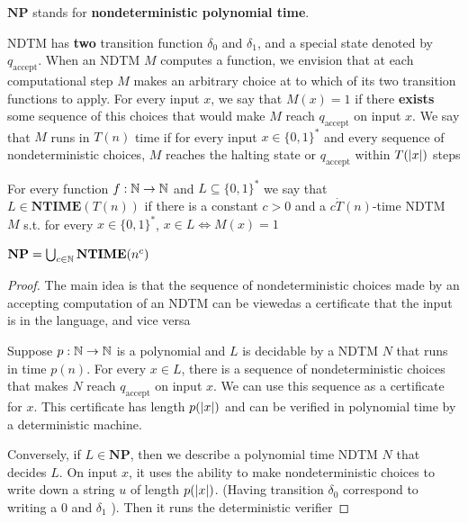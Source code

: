 \documentclass[11pt]{article}
\def \NTIME {\textbf{NTIME}}
\def \NP {\textbf{NP}}
\def \NP {\textbf{NP}}
\def \accept {\text{accept}}
\begin{document}
\(\NP\) stands for \textbf{nondeterministic polynomial time}.

NDTM has \textbf{two} transition function \(\delta_0\) and \(\delta_1\), and a special state denoted
by \(q_{\accept}\). When an NDTM \(M\) computes a function, we envision that at each
computational step \(M\) makes an arbitrary choice at to which of its two transition functions
to apply. For every input \(x\), we say that \(M(x)=1\) if there \textbf{exists} some sequence of this
choices that would make \(M\) reach \(q_{\accept}\) on input \(x\). We say that \(M\) runs
in \(T(n)\) time if for every input \(x\in\{0,1\}^*\) and every sequence of nondeterministic
choices, \(M\) reaches the halting state or \(q_{\accept}\) within \(T(\abs{x})\) steps

\begin{definition}[]
For every function \(f:\mathbb{N}\to\mathbb{N}\) and \(L\subseteq\{0,1\}^*\) we say that \(L\in\NTIME(T(n))\)
if there is a constant \(c>0\) and a \(c\dot T(n)\)-time NDTM \(M\) s.t. for
every \(x\in\{0,1\}^*\), \(x\in L\Leftrightarrow M(x)=1\)
\end{definition}

\begin{theorem}[]
\(\NP=\bigcup_{c\in\N}\NTIME(n^c)\)
\end{theorem}

\begin{proof}
The main idea is that the sequence of nondeterministic choices made by an accepting computation
of an NDTM can be viewedas a certificate that the input is in the language, and vice versa

Suppose \(p:\mathbb{N}\to\mathbb{N}\) is a polynomial and \(L\) is decidable by a NDTM \(N\) that runs in
time \(p(n)\). For every \(x\in L\), there is a sequence of nondeterministic choices that
makes \(N\) reach \(q_{\accept}\) on input \(x\). We can use this sequence as a certificate
for \(x\). This certificate has length \(p(\abs{x})\) and can be verified in polynomial time by
a deterministic machine.

Conversely, if \(L\in\NP\), then we describe a polynomial time NDTM \(N\) that decides \(L\).
On input \(x\), it uses the ability to make nondeterministic choices to write down a
string \(u\) of length \(p(\abs{x})\). (Having transition \(\delta_0\) correspond to writing a
0 and \(\delta_1\) ). Then it runs the deterministic verifier
\end{proof}
\end{document}
